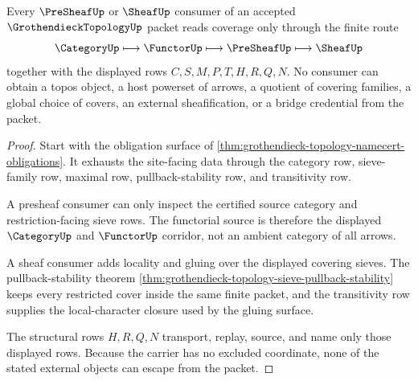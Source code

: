 \begin{theorem}
\label{thm:grothendieck-topology-nonescape}
Every $\PreSheafUp$ or $\SheafUp$ consumer of an accepted $\GrothendieckTopologyUp$ packet reads coverage only through the finite route
$$
\CategoryUp \longmapsto \FunctorUp \longmapsto \PreSheafUp \longmapsto \SheafUp
$$
together with the displayed rows $C,S,M,P,T,H,R,Q,N$. No consumer can obtain a topos object, a host powerset of arrows, a quotient of covering families, a global choice of covers, an external sheafification, or a bridge credential from the packet.
\end{theorem}
\begin{proof}
Start with the obligation surface of \autoref{thm:grothendieck-topology-namecert-obligations}. It exhausts the site-facing data through the category row, sieve-family row, maximal row, pullback-stability row, and transitivity row.

A presheaf consumer can only inspect the certified source category and restriction-facing sieve rows. The functorial source is therefore the displayed $\CategoryUp$ and $\FunctorUp$ corridor, not an ambient category of all arrows.

A sheaf consumer adds locality and gluing over the displayed covering sieves. The pullback-stability theorem \autoref{thm:grothendieck-topology-sieve-pullback-stability} keeps every restricted cover inside the same finite packet, and the transitivity row supplies the local-character closure used by the gluing surface.

The structural rows $H,R,Q,N$ transport, replay, source, and name only those displayed rows. Because the carrier has no excluded coordinate, none of the stated external objects can escape from the packet.
\end{proof}




